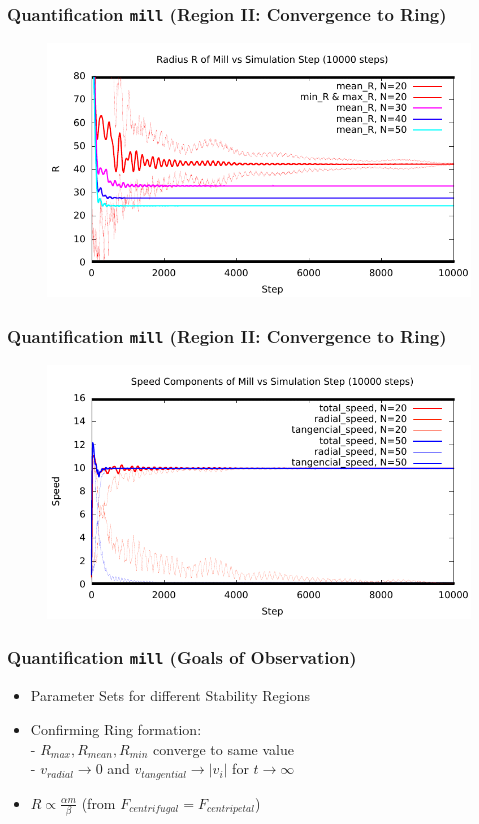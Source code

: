 \documentclass[compress]{beamer}
\begin{document}
\begin{frame}
	\frametitle{Quantification \texttt{mill} \small (Region II: Convergence to Ring)} \normalsize
	\begin{figure}[H]
		\includegraphics[width=1. \columnwidth]{../plots/mill_II_radius_dt_allN.pdf}
	\end{figure}	
\end{frame}


\begin{frame}
	\frametitle{Quantification \texttt{mill} \small (Region II: Convergence to Ring)} \normalsize
	\begin{figure}[H]
		\includegraphics[width=1. \columnwidth]{../plots/mill_II_speeds_dt_allN.pdf}
	\end{figure}	
\end{frame}

\begin{frame}
	\frametitle{Quantification \texttt{mill} \small (Goals of Observation)} \normalsize
	\begin{itemize}
		\item Parameter Sets for different Stability Regions
		\item Confirming Ring formation: \\
			- \( R_{max}, R_{mean}, R_{min} \) converge to same value \\
			- \( v_{radial} \to 0 \) and \( v_{tangential} \to | v_{i} |  \) for \( t \to \infty \)
		\item  \( R \propto \frac{\alpha m}{\beta}\) \small (from  \( F_{centrifugal} = F_{centripetal} \)) \normalsize
	\end{itemize}
\end{frame}
\end{document}
